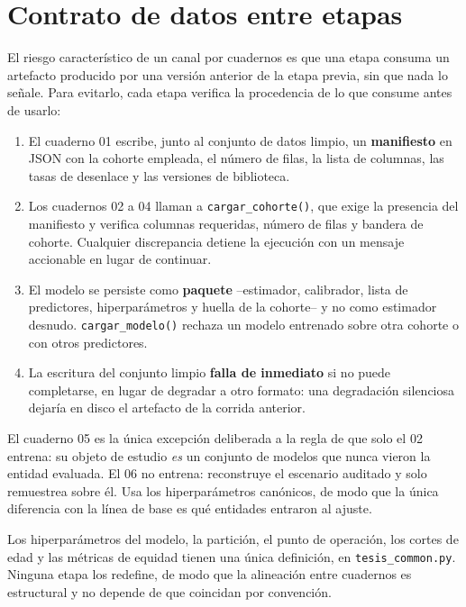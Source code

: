\section{Contrato de datos entre etapas}

El riesgo característico de un canal por cuadernos es que una etapa consuma un
artefacto producido por una versión anterior de la etapa previa, sin que nada lo
señale. Para evitarlo, cada etapa verifica la procedencia de lo que consume antes
de usarlo:

\begin{enumerate}[leftmargin=*]
  \item El cuaderno 01 escribe, junto al conjunto de datos limpio, un
    \textbf{manifiesto} en JSON con la cohorte empleada, el número de filas, la
    lista de columnas, las tasas de desenlace y las versiones de biblioteca.
  \item Los cuadernos 02 a 04 llaman a \texttt{cargar\_cohorte()}, que exige la
    presencia del manifiesto y verifica columnas requeridas, número de filas y
    bandera de cohorte. Cualquier discrepancia detiene la ejecución con un mensaje
    accionable en lugar de continuar.
  \item El modelo se persiste como \textbf{paquete} --estimador, calibrador,
    lista de predictores, hiperparámetros y huella de la cohorte-- y no como
    estimador desnudo. \texttt{cargar\_modelo()} rechaza un modelo entrenado sobre
    otra cohorte o con otros predictores.
  \item La escritura del conjunto limpio \textbf{falla de inmediato} si no puede
    completarse, en lugar de degradar a otro formato: una degradación silenciosa
    dejaría en disco el artefacto de la corrida anterior.
\end{enumerate}

El cuaderno 05 es la única excepción deliberada a la regla de que solo el 02
entrena: su objeto de estudio \emph{es} un conjunto de modelos que nunca vieron la
entidad evaluada. El 06 no entrena: reconstruye el escenario auditado y solo
remuestrea sobre él. Usa los hiperparámetros canónicos, de modo que la única
diferencia con la línea de base es qué entidades entraron al ajuste.

Los hiperparámetros del modelo, la partición, el punto de operación, los cortes de
edad y las métricas de equidad tienen una única definición, en
\texttt{tesis\_common.py}. Ninguna etapa los redefine, de modo que la alineación
entre cuadernos es estructural y no depende de que coincidan por convención.

